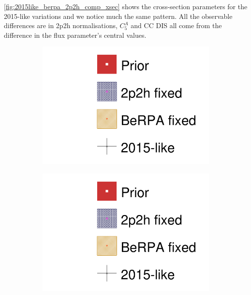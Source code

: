 \autoref{fig:2015like_berpa_2p2h_comp_xsec} shows the cross-section parameters for the 2015-like variations and we notice much the same pattern. All the observable differences are in 2p2h normalisations, $C_5^A$ and CC DIS all come from the difference in the flux parameter's central values.
\begin{figure}[h]
	\begin{subfigure}[t]{0.49\textwidth}
		\includegraphics[width=\textwidth, trim={0mm 0mm 0mm 0mm}, clip,page=18]{figures/mach3/data/alt/2017b_NewData_NewDet_hpc_2p2hshapeFix_0_2017b_NewData_NewDet_hpc_BeRPAfix_0_2017b_NewData_NewDet_hpc_2015like_0.pdf}
	\end{subfigure}
	\begin{subfigure}[t]{0.49\textwidth}
		\includegraphics[width=\textwidth, trim={0mm 0mm 0mm 0mm}, clip,page=19]{figures/mach3/data/alt/2017b_NewData_NewDet_hpc_2p2hshapeFix_0_2017b_NewData_NewDet_hpc_BeRPAfix_0_2017b_NewData_NewDet_hpc_2015like_0.pdf}
	\end{subfigure}
	

\end{figure}
